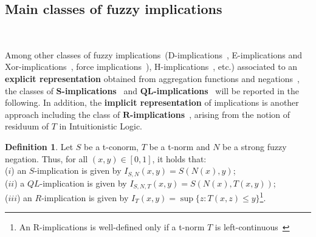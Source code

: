 \documentclass[12pt]{article}
\theoremstyle{plain}
\theoremstyle{remark}
\theoremstyle{definition}
\newtheorem{definition}[theorem]{Definition}
\theoremstyle{proposition}
\begin{document}
\subsection{Main classes of fuzzy implications}~\label{subsec-5a}

Among other classes of fuzzy
implications~(D-implications~\cite{Reiser-tema2009},
E-implications and Xor-implications~\cite{BRD09}, force implications~\cite{Duj95}), H-implications~\cite{MassanetT11}, etc.)
associated to an \textbf{explicit representation} obtained from
aggregation functions and negations~\cite{Mas07a}, the classes of
$\mathbf{S}$\textbf{-implications}~\cite{Bed10b} and
$\mathbf{QL}$\textbf{-implications}~\cite{Rei07,SHI08} will be reported in the
following.
In addition, the \textbf{implicit representation} of
implications is another approach including  the class of
$\mathbf{R}$\textbf{-implications}~\cite{BJ08}, arising from the notion
of residuum of $T$ in Intuitionistic Logic.



\begin{definition}
Let $S$ be a t-conorm, $T$ be a
t-norm and $N$ be a strong fuzzy negation. Thus, for all $(x,y)\in [0,1]$, it holds that: \\
($i$) an $S$-implication is given by $I_{S,N}(x,y)=S(N(x),y)$;\\
($ii$) a $QL$-implication is given by $I_{S,N,T}(x,y)=S(N(x),T(x,y))$;\\
($iii$) an $R$-implication is given by $I_T(x,y)=\sup\{z:T(x,z)\leq y\}$\footnote{An R-implications is well-defined only if a t-norm $T$ is left-continuous~\cite{BT06b}}.
\end{definition}
\end{document}
